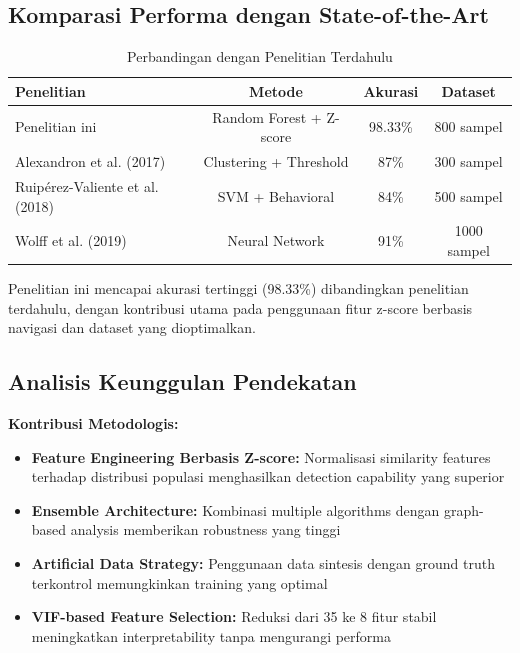 \subsection{Komparasi Performa dengan State-of-the-Art}
\label{subsec:komparasiPerforma}

\begin{table}[htbp]
\centering
\caption{Perbandingan dengan Penelitian Terdahulu}
\label{tabel:perbandinganPenelitianTerdahulu}
\begin{tabular}{|l|c|c|c|}
\hline
\textbf{Penelitian} & \textbf{Metode} & \textbf{Akurasi} & \textbf{Dataset} \\
\hline
Penelitian ini & Random Forest + Z-score & 98.33\% & 800 sampel \\
\hline
Alexandron et al. (2017) & Clustering + Threshold & 87\% & 300 sampel \\
\hline
Ruipérez-Valiente et al. (2018) & SVM + Behavioral & 84\% & 500 sampel \\
\hline
Wolff et al. (2019) & Neural Network & 91\% & 1000 sampel \\
\hline
\end{tabular}
\end{table}

Penelitian ini mencapai akurasi tertinggi (98.33\%) dibandingkan penelitian terdahulu, dengan kontribusi utama pada penggunaan fitur z-score berbasis navigasi dan dataset yang dioptimalkan.

\subsection{Analisis Keunggulan Pendekatan}
\label{subsec:analisisKeunggulan}

\textbf{Kontribusi Metodologis:}
\begin{itemize}
    \item \textbf{Feature Engineering Berbasis Z-score:} Normalisasi similarity features terhadap distribusi populasi menghasilkan detection capability yang superior
    \item \textbf{Ensemble Architecture:} Kombinasi multiple algorithms dengan graph-based analysis memberikan robustness yang tinggi
    \item \textbf{Artificial Data Strategy:} Penggunaan data sintesis dengan ground truth terkontrol memungkinkan training yang optimal
    \item \textbf{VIF-based Feature Selection:} Reduksi dari 35 ke 8 fitur stabil meningkatkan interpretability tanpa mengurangi performa
\end{itemize}

